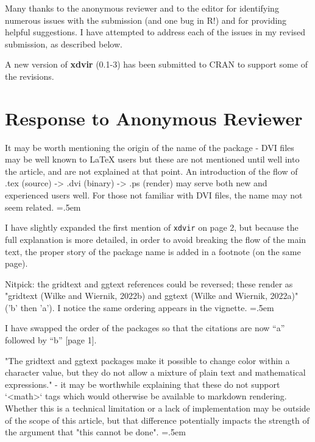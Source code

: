\documentclass{article}
\newcommand{\code}[1]{\texttt{#1}}
\newenvironment{lcverbatim}
 {\SaveVerbatim{cverb}}
 {\endSaveVerbatim
  \flushleft\fboxrule=0pt\fboxsep=.5em
  \colorbox{cverbbg}{%
    \makebox[\dimexpr\linewidth-2\fboxsep][l]{\BUseVerbatim{cverb}}%
  }
  \endflushleft
}
\begin{document}
Many thanks to the anonymous reviewer and to the editor for identifying numerous
issues with the submission (and one bug in R!)
and for providing helpful suggestions.  I have attempted
to address each of the issues in my revised submission, as described below.

A new version of {\bf xdvir} (0.1-3) has been submitted to CRAN to 
support some of the revisions.

\section*{Response to Anonymous Reviewer}

\begin{lcverbatim}
  It may be worth mentioning the origin of the name of the package - DVI files
  may be well known to LaTeX users but these are not mentioned until well into 
  the article, and are not explained at that point. An introduction of the 
  flow of .tex (source) -> .dvi (binary) -> .ps (render) may serve both new and
  experienced users well. For those not familiar with DVI files, the name may
  not seem related.
\end{lcverbatim}

I have slightly expanded the first mention of \code{xdvir} on page 2,
but because the full explanation is more detailed, in order to avoid
breaking the flow of the main text, the proper story of
the package name is added in a footnote (on the same page).

\begin{lcverbatim}
  Nitpick: the {gridtext} and {ggtext} references could be reversed; these 
  render as "gridtext (Wilke and Wiernik, 2022b) and ggtext (Wilke and Wiernik, 
  2022a)" ('b' then 'a'). I notice the same ordering appears in the vignette.
\end{lcverbatim}

I have swapped the order of the packages so that the citations are now ``a'' 
followed by ``b'' [page 1].

\begin{lcverbatim}
  "The gridtext and ggtext packages make it possible to change color within a
  character value, but they do not allow a mixture of plain text and 
  mathematical expressions." - it may be worthwhile explaining that these do 
  not support `<math>` tags which would otherwise be available to markdown 
  rendering. Whether this is a technical limitation or a lack of implementation 
  may be outside of the scope of this article, but that difference potentially 
  impacts the strength of the argument that "this cannot be done".
\end{lcverbatim}
\end{document}
